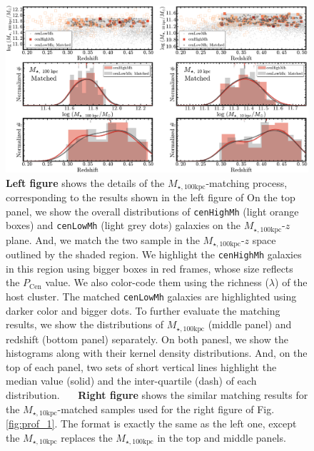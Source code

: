 \documentclass{emulateapj}
\def\rbcg{\texttt{cenHighMh}}
\def\nbcg{\texttt{cenLowMh}}
\def\minn{{$M_{\star,10\mathrm{kpc}}$}}
\def\mtot{{$M_{\star,100\mathrm{kpc}}$}}
\begin{document}
\begin{CJK*}{UTF8}{gbsn}
\begin{figure}[hbt!]
    \centering 
    \includegraphics[width=\textwidth]{fig/redbcg_match}
    \caption{\textbf{Left figure} shows the details of the \mtot{}-matching process, 
        corresponding to the results shown in the left figure of   
        On the top panel, we show the overall distributions of \rbcg{} (light orange boxes) 
        and \nbcg{} (light grey dots) galaxies on the \mtot{}-$z$ plane.  
        And, we match the two sample in the \mtot{}-$z$ space outlined by the shaded region.
        We highlight the \rbcg{} galaxies in this region using bigger boxes in red frames, 
        whose size reflects the $P_{\mathrm{Cen}}$ value.  
        We also color-code them using the richness ($\lambda$) of the host cluster. 
        The matched \nbcg{} galaxies are highlighted using darker color and bigger dots. 
        To further evaluate the matching results, we show the distributions of \mtot{} 
        (middle panel) and redshift (bottom panel) separately. 
        On both panesl, we show the histograms along with their kernel density 
        distributions.  
        And, on the top of each panel, two sets of short vertical lines highlight the median 
        value (solid) and the inter-quartile (dash) of each distribution.~~~
        \textbf{Right figure} shows the similar matching results for the \minn{}-matched
        samples used for the right figure of Fig.\ref{fig:prof_1}.
        The format is exactly the same as the left one, except the \minn{} replaces the 
        \mtot{} in the top and middle panels.}
    \label{fig:match}
\end{figure}
    

\end{CJK*}
\end{document}
